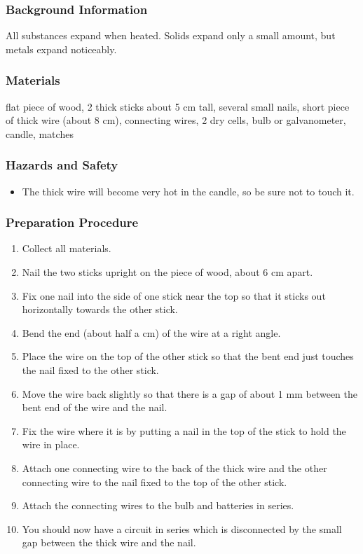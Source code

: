 \subsubsection*{Background Information}
All substances expand when heated. Solids expand only a small amount, but metals expand noticeably.  

\subsubsection*{Materials}
flat piece of wood, 2 thick sticks about 5 cm tall, several small nails, short piece of thick wire (about 8 cm), connecting wires, 2 dry cells, bulb or galvanometer, candle, matches

\subsubsection*{Hazards and Safety}
\begin{itemize}
\item{The thick wire will become very hot in the candle, so be sure not to touch it.} 
\end{itemize}

\subsubsection*{Preparation Procedure}
\begin{enumerate}
\item{Collect all materials.} 
\item{Nail the two sticks upright on the piece of wood, about 6 cm apart.} 
\item{Fix one nail into the side of one stick near the top so that it sticks out horizontally towards the other stick.} 
\item{Bend the end (about half a cm) of the wire at a right angle.} 
\item{Place the wire on the top of the other stick so that the bent end just touches the nail fixed to the other stick.} 
\item{Move the wire back slightly so that there is a gap of about 1 mm between the bent end of the wire and the nail.} 
\item{Fix the wire where it is by putting a nail in the top of the stick to hold the wire in place.} 
\item{Attach one connecting wire to the back of the thick wire and the other connecting wire to the nail fixed to the top of the other stick.} 
\item{Attach the connecting wires to the bulb and batteries in series.} 
\item{You should now have a circuit in series which is disconnected by the small gap between the thick wire and the nail.} 
\end{enumerate}

